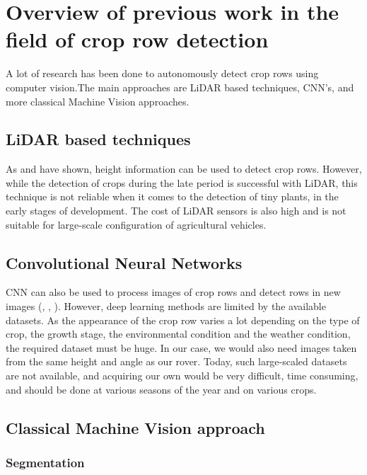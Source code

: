 \chapter{Overview of previous work in the field of crop row detection}
\label{sec:latexumg}

A lot of research has been done to autonomously detect crop rows using computer vision.The main approaches are LiDAR based techniques, CNN's, and more classical Machine Vision approaches. \\

\section{LiDAR based techniques}


As \citet{AgricultureLiDARZhang} and \citet{LiDARCHangingplantgrowth} have shown,  height information can be used to detect crop rows. However, while the detection of crops during the late period is successful with LiDAR, this technique is not reliable when it comes to the detection of tiny plants, in the early stages of development. The cost of LiDAR sensors is also high and is not suitable for large-scale configuration of agricultural vehicles.   

\section{Convolutional Neural Networks}
CNN can also be used to process images of crop rows and detect rows in new images (\citet{CNN1}, \citet{thesisDOHA}, \citet{DeepLearning2}). However, deep learning methods are limited by the available datasets. As the appearance of the crop row varies a lot depending on the type of crop, the growth stage, the environmental condition and the weather condition, the required dataset must be huge. In our case, we would also need images taken from the same height and angle as our rover.  Today, such large-scaled datasets are not available, and acquiring our own would be very difficult, time consuming, and should be done at various seasons of the year and on various crops.

\section{Classical Machine Vision approach}


\subsection{Segmentation}

